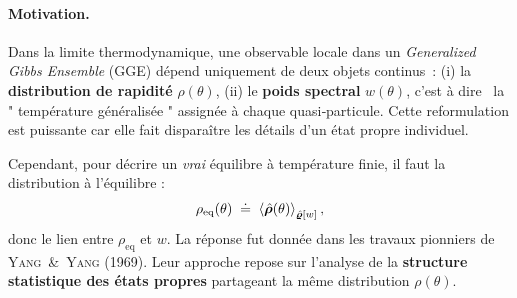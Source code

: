 
\paragraph{Motivation.}

Dans la limite thermodynamique, une observable locale dans un \textit{Generalized Gibbs Ensemble} (GGE) dépend uniquement de deux objets continus :  (i)  la \textbf{distribution de rapidité} $\rho(\theta)$, (ii) le \textbf{poids spectral} $w(\theta)$, c'est à dire \ la " température généralisée " assignée à chaque quasi‑particule.
Cette reformulation est puissante car elle fait disparaître les détails d’un état propre individuel.  

\medskip
Cependant, pour décrire un \emph{vrai} équilibre à température finie, il faut la distribution à l'équilibre :
\begin{eqnarray}\label{chap.2:eq.rho.eq.1}
	\rho_{\mathrm{eq}}(\theta)\;\doteq\;\braket{\hat{\bm{\rho}}(\theta)}_{\hat{\bm{\varrho}}[w]}	,  
\end{eqnarray}
donc le lien entre $\rho_{\mathrm{eq}}$ et $w$.
La réponse fut donnée dans les travaux pionniers de \textsc{Yang \& Yang} (1969).  
Leur approche repose sur l’analyse de la \textbf{structure statistique des états propres} partageant la même distribution $\rho(\theta)$.

